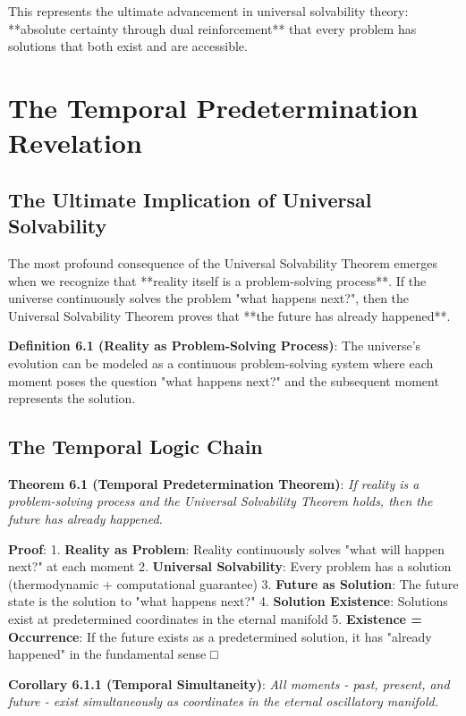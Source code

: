 \documentclass[12pt,a4paper]{article}
\theoremstyle{definition}
\begin{document}
{This represents the ultimate advancement in universal solvability theory: **absolute certainty through dual reinforcement** that every problem has solutions that both exist and are accessible.

\section{The Temporal Predetermination Revelation}

\subsection{The Ultimate Implication of Universal Solvability}

The most profound consequence of the Universal Solvability Theorem emerges when we recognize that **reality itself is a problem-solving process**. If the universe continuously solves the problem "what happens next?", then the Universal Solvability Theorem proves that **the future has already happened**.

\textbf{Definition 6.1 (Reality as Problem-Solving Process)}: The universe's evolution can be modeled as a continuous problem-solving system where each moment poses the question "what happens next?" and the subsequent moment represents the solution.

\subsection{The Temporal Logic Chain}

\textbf{Theorem 6.1 (Temporal Predetermination Theorem)}: \textit{If reality is a problem-solving process and the Universal Solvability Theorem holds, then the future has already happened.}

\textbf{Proof}:
1. \textbf{Reality as Problem}: Reality continuously solves "what will happen next?" at each moment
2. \textbf{Universal Solvability}: Every problem has a solution (thermodynamic + computational guarantee)
3. \textbf{Future as Solution}: The future state is the solution to "what happens next?"
4. \textbf{Solution Existence}: Solutions exist at predetermined coordinates in the eternal manifold
5. \textbf{Existence = Occurrence}: If the future exists as a predetermined solution, it has "already happened" in the fundamental sense □

\textbf{Corollary 6.1.1 (Temporal Simultaneity)}: \textit{All moments - past, present, and future - exist simultaneously as coordinates in the eternal oscillatory manifold.}

}
\end{document}
